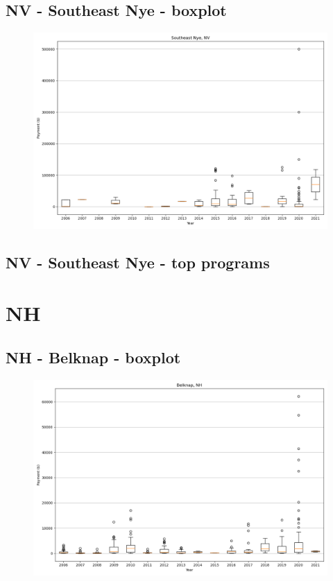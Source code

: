 \subsection*{NV - Southeast Nye - boxplot}
\begin{figure}[h]
\centering
\includegraphics[width=7in]{../output/boxplots/counties/Southeast Nye-NV_boxplot.png}
\end{figure}


\subsection*{NV - Southeast Nye - top programs}

\newpage
\section*{NH}
\subsection*{NH - Belknap - boxplot}
\begin{figure}[h]
\centering
\includegraphics[width=7in]{../output/boxplots/counties/Belknap-NH_boxplot.png}
\end{figure}


